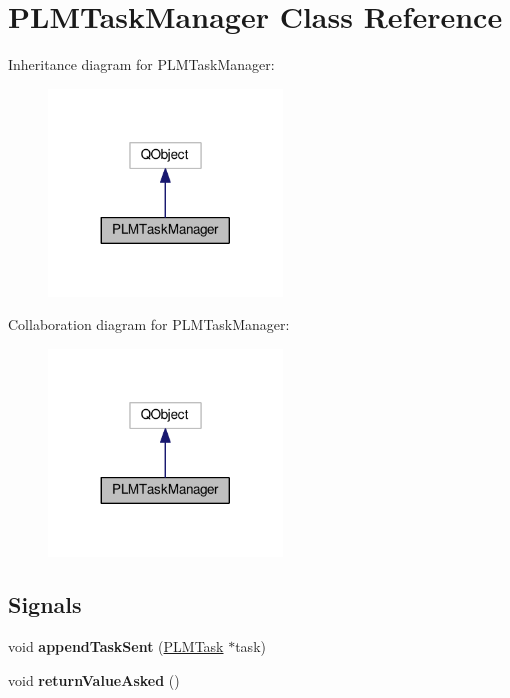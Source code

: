 \hypertarget{class_p_l_m_task_manager}{}\section{P\+L\+M\+Task\+Manager Class Reference}
\label{class_p_l_m_task_manager}


Inheritance diagram for P\+L\+M\+Task\+Manager\+:\nopagebreak
\begin{figure}[H]
\begin{center}
\leavevmode
\includegraphics[width=176pt]{class_p_l_m_task_manager__inherit__graph}
\end{center}
\end{figure}


Collaboration diagram for P\+L\+M\+Task\+Manager\+:\nopagebreak
\begin{figure}[H]
\begin{center}
\leavevmode
\includegraphics[width=176pt]{class_p_l_m_task_manager__coll__graph}
\end{center}
\end{figure}
\subsection*{Signals}
\begin{DoxyCompactItemize}
\item 
void {\bfseries append\+Task\+Sent} (\hyperlink{class_p_l_m_task}{P\+L\+M\+Task} $\ast$task)\hypertarget{class_p_l_m_task_manager_a96f657566aca5d6647ff5d417e216014}{}\label{class_p_l_m_task_manager_a96f657566aca5d6647ff5d417e216014}

\item 
void {\bfseries return\+Value\+Asked} ()\hypertarget{class_p_l_m_task_manager_ab99b42a981d16d1fddd24e36aaa50c6b}{}\label{class_p_l_m_task_manager_ab99b42a981d16d1fddd24e36aaa50c6b}

\end{DoxyCompactItemize}
